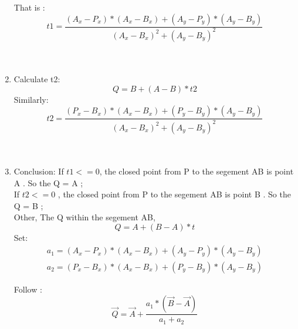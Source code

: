 \documentclass[12pt]{article}
\begin{document}
\begin{enumerate}
		That is :
		\begin{equation}
		t1 = \frac{(A_x-P_x)*(A_x-B_x)+(A_y-P_y) * (A_y-B_y)}{(A_x- B_x)^2+(A_y-B_y)^2}
		\end{equation}\\\\
	\item Calculate t2:
		\begin{equation}
		Q=B+(A-B)*t2
		\end{equation}
		Similarly:
		\begin{equation}
		t2 = \frac{(P_x-B_x)*(A_x-B_x)+(P_y-B_y) * (A_y-B_y)}{(A_x- B_x)^2+(A_y-B_y)^2}
		\end{equation}\\\\
	\item Conclusion:
		If $t1<=0$, the closed point from P to the segement AB is point A . So the Q = A ;\\
		If $t2 <= 0$ , the closed point from P to the segement AB is point B . So the Q = B ;\\
		Other, The Q within the segement AB,
		\begin{equation}
		Q = A + (B-A) * t
		\end{equation}
		Set: 
		\begin{eqnarray}
		a_1 = (A_x-P_x)*(A_x-B_x)+(A_y-P_y) * (A_y-B_y)\\
		a_2 = (P_x-B_x)*(A_x-B_x)+(P_y-B_y) * (A_y-B_y)
		\end{eqnarray}
		
		Follow : 
		\begin{equation}
		\vec{Q} =\vec{A} +  \frac{a_1*(\vec{B} - \vec{A})}{a_1 + a_2}
		\end{equation}
\end{enumerate}
\end{document}
